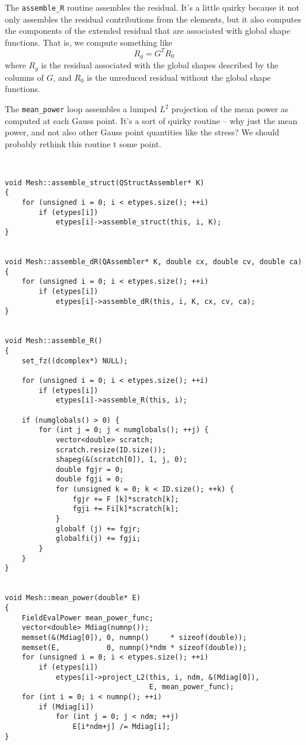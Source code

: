 The {\tt assemble\_R} routine assembles the residual.  It's a
little quirky because it not only assembles the residual
contributions from the elements, but it also computes the
components of the extended residual that are associated with global
shape functions.  That is, we compute something like
\[
R_g = G^T R_0
\]
where $R_g$ is the residual associated with the global shapes
described by the columns of $G$, and $R_0$ is the unreduced
residual without the global shape functions.

The {\tt mean\_power} loop assembles a lumped $L^2$ projection
of the mean power as computed at each Gauss point.  It's a sort of
quirky routine -- why just the mean power, and not also other Gauss
point quantities like the stress?  We should probably rethink this
routine t some point.

\begin{verbatim}


void Mesh::assemble_struct(QStructAssembler* K)
{
    for (unsigned i = 0; i < etypes.size(); ++i)
        if (etypes[i])
            etypes[i]->assemble_struct(this, i, K);
}


void Mesh::assemble_dR(QAssembler* K, double cx, double cv, double ca)
{
    for (unsigned i = 0; i < etypes.size(); ++i)
        if (etypes[i])
            etypes[i]->assemble_dR(this, i, K, cx, cv, ca);
}


void Mesh::assemble_R()
{
    set_fz((dcomplex*) NULL);

    for (unsigned i = 0; i < etypes.size(); ++i)
        if (etypes[i])
            etypes[i]->assemble_R(this, i);

    if (numglobals() > 0) {
        for (int j = 0; j < numglobals(); ++j) {
            vector<double> scratch;
            scratch.resize(ID.size());
            shapeg(&(scratch[0]), 1, j, 0);
            double fgjr = 0;
            double fgji = 0;
            for (unsigned k = 0; k < ID.size(); ++k) {
                fgjr += F [k]*scratch[k];
                fgji += Fi[k]*scratch[k];
            }
            globalf (j) += fgjr;
            globalfi(j) += fgji;
        }
    }
}


void Mesh::mean_power(double* E)
{
    FieldEvalPower mean_power_func;
    vector<double> Mdiag(numnp());
    memset(&(Mdiag[0]), 0, numnp()     * sizeof(double));
    memset(E,           0, numnp()*ndm * sizeof(double));
    for (unsigned i = 0; i < etypes.size(); ++i)
        if (etypes[i])
            etypes[i]->project_L2(this, i, ndm, &(Mdiag[0]), 
                                  E, mean_power_func);
    for (int i = 0; i < numnp(); ++i)
        if (Mdiag[i])
            for (int j = 0; j < ndm; ++j)
                E[i*ndm+j] /= Mdiag[i];
}


\end{verbatim}
